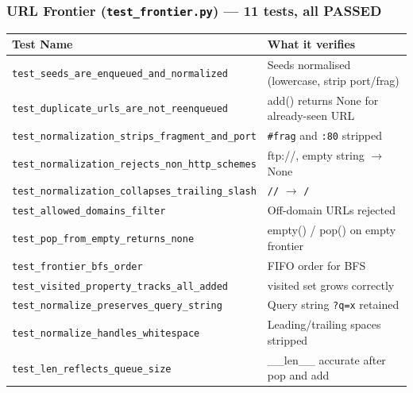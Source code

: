 \documentclass[12pt]{article}
\begin{document}
\subsubsection*{URL Frontier (\texttt{test\_frontier.py}) --- 11 tests, all PASSED}
\begin{table}[H]
\centering
\footnotesize
\begin{tabular}{|p{7cm}|p{7.5cm}|}
\hline
\textbf{Test Name} & \textbf{What it verifies} \\
\hline
\texttt{test\_seeds\_are\_enqueued\_and\_normalized}         & Seeds normalised (lowercase, strip port/frag) \\
\texttt{test\_duplicate\_urls\_are\_not\_reenqueued}         & add() returns None for already-seen URL \\
\texttt{test\_normalization\_strips\_fragment\_and\_port}    & \texttt{\#frag} and \texttt{:80} stripped \\
\texttt{test\_normalization\_rejects\_non\_http\_schemes}    & ftp://, empty string $\to$ None \\
\texttt{test\_normalization\_collapses\_trailing\_slash}     & \texttt{//} $\to$ \texttt{/} \\
\texttt{test\_allowed\_domains\_filter}                     & Off-domain URLs rejected \\
\texttt{test\_pop\_from\_empty\_returns\_none}              & empty() / pop() on empty frontier \\
\texttt{test\_frontier\_bfs\_order}                         & FIFO order for BFS \\
\texttt{test\_visited\_property\_tracks\_all\_added}        & visited set grows correctly \\
\texttt{test\_normalize\_preserves\_query\_string}          & Query string \texttt{?q=x} retained \\
\texttt{test\_normalize\_handles\_whitespace}               & Leading/trailing spaces stripped \\
\texttt{test\_len\_reflects\_queue\_size}                   & \_\_len\_\_ accurate after pop and add \\
\hline
\end{tabular}
\end{table}
\end{document}
